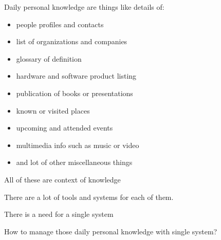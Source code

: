 \documentclass[10pt, compress]{beamer}
\begin{document}
\begin{frame}[fragile]

  \begin{center}
  \alert{Daily personal knowledge} are things like details of:
  \begin{itemize} \itemsep0pt
    \item people profiles and contacts
    \item list of organizations and companies
    \item glossary of definition
    \item hardware and software product listing
    \item publication of books or presentations
    \item known or visited places
    \item upcoming and attended events
    \item multimedia info such as music or video
    \item and lot of other miscellaneous things
  \end{itemize}

  \alert{All of these are context of knowledge}

  \end{center}

\end{frame}


\begin{frame}[fragile]

  \begin{center}
    There are a \alert{lot of tools and systems} for each of them.

    There is a \alert{need for a single system}
  \end{center}

\end{frame}


\begin{frame}[fragile]

  \begin{center}
  How to manage those \alert{daily personal knowledge} with \alert{single system}?
  \end{center}

\end{frame}
\end{document}
